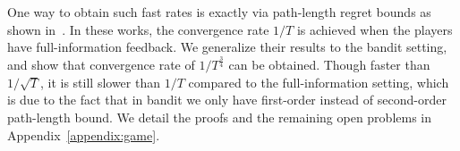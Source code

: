 \documentclass[final, 12pt]{colt2018} %
\begin{document}
One way to obtain such fast rates is exactly via path-length regret bounds as shown in~\citep{rakhlin2013optimization, syrgkanis2015fast}. In these works, the convergence rate $1/T$ is achieved when the players have full-information feedback. 
We generalize their results to the bandit setting, and show that convergence rate of $ 1/T^{\frac{3}{4}} $ can be obtained. Though faster than $1/\sqrt{T}$, it is still slower than $1/T$ compared to the full-information setting, which is due to the fact that in bandit we only have first-order instead of second-order path-length bound. We detail the proofs and the remaining open problems in Appendix~\ref{appendix:game}. 


\end{document}
